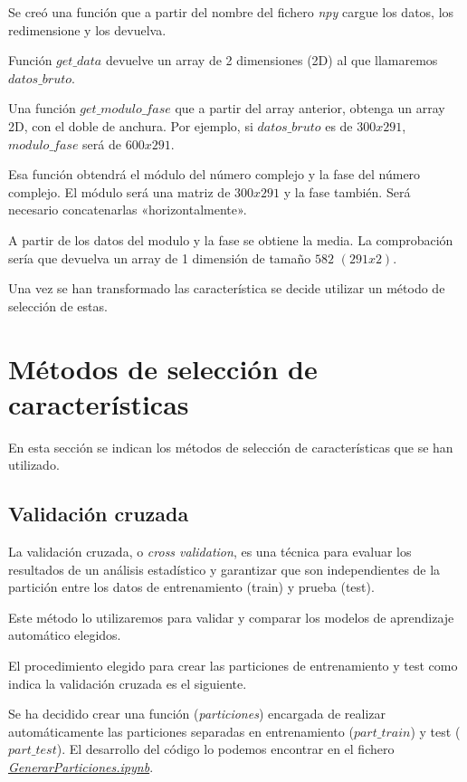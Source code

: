 Se creó una función que a partir del nombre del fichero \textit{npy} cargue los datos, los redimensione y los devuelva.

Función $get\_data$ devuelve un array de 2 dimensiones (2D) al que llamaremos $datos\_bruto$. 



Una función \textit{$get\_modulo\_fase$} que a partir del array anterior, obtenga un array 2D, con el doble de anchura. Por ejemplo, si \textit{$datos\_bruto$} es de $300 x 291$, $modulo\_fase$ será de $600 x 291$. 

Esa función obtendrá el módulo del número complejo y la fase del número complejo. El módulo será una matriz de $300 x 291$ y la fase también. Será necesario concatenarlas «horizontalmente». 



A partir de los datos del modulo y la fase se obtiene la media. La comprobación sería que devuelva un array de 1 dimensión de tamaño $582$ $(291 x 2)$.


Una vez se han transformado las característica se decide utilizar un método de selección de estas.

\section{Métodos de selección de características}

En esta sección se indican los métodos de selección de características que se han utilizado.

\subsection{Validación cruzada}

La validación cruzada, o \textit{cross validation}, es una técnica para evaluar los resultados de un análisis estadístico y garantizar que son independientes de la partición entre los datos de entrenamiento (train) y prueba (test).

Este método lo utilizaremos para validar y comparar los modelos de aprendizaje automático elegidos.

El procedimiento elegido para crear las particiones de entrenamiento y test como indica la validación cruzada es el siguiente.

Se ha decidido crear una función (\textit{particiones}) encargada de realizar automáticamente las particiones separadas en entrenamiento ($part\_train$) y test ($part\_test$). El desarrollo del código lo podemos encontrar en el fichero \href{https://github.com/mecyc/TFG_RADAR_60GHZ/blob/main/scripts/GenerarParticiones.ipynb}{\textit{GenerarParticiones.ipynb}}.

